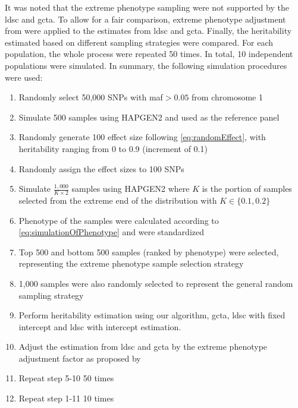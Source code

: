 		It was noted that the extreme phenotype sampling were not supported by the \gls{ldsc} and \gls{gcta}.
		To allow for a fair comparison, extreme phenotype adjustment from \citet{Sham2014} were applied to the estimates from \gls{ldsc} and \gls{gcta}.
		Finally, the heritability estimated based on different sampling strategies were compared.
		For each population, the whole process were repeated 50 times. 
		In total, 10 independent populations were simulated. 
		In summary, the following simulation procedures were used:
		\begin{enumerate}
			\item Randomly select 50,000 \glspl{SNP} with \gls{maf}$>0.05$ from chromosome 1
			\item Simulate 500 samples using HAPGEN2 and used as the reference panel
			\item Randomly generate 100 effect size following \cref{eq:randomEffect}, with heritability ranging from 0 to 0.9 (increment of 0.1)
			\item Randomly assign the effect sizes to 100 \glspl{SNP}
			\item Simulate $\frac{1,000}{K\times2}$ samples using HAPGEN2 where $K$ is the portion of samples selected from the extreme end of the distribution with $K\in\{0.1,0.2\}$
			\item Phenotype of the samples were calculated according to \cref{eq:simulationOfPhenotype} and were standardized
			\item Top 500 and bottom 500 samples (ranked by phenotype) were selected, representing the extreme phenotype sample selection strategy
			\item 1,000 samples were also randomly selected to represent the general random sampling strategy
			\item Perform heritability estimation using our algorithm, \gls{gcta}, \gls{ldsc} with fixed intercept and \gls{ldsc} with intercept estimation.
			\item Adjust the estimation from \gls{ldsc} and \gls{gcta} by the extreme phenotype adjustment factor as proposed by \citet{Sham2014}
			\item Repeat step 5-10 50 times
			\item Repeat step 1-11 10 times
		\end{enumerate}
		
		
	
